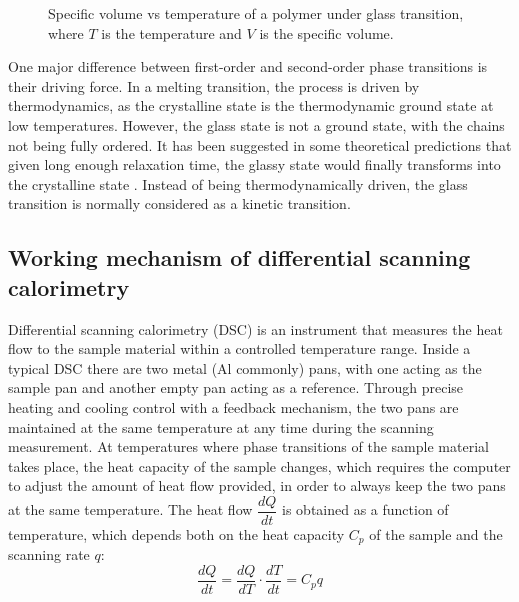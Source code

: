 \begin{figure}[H]
	\center
{}
	\caption{Specific volume vs temperature of a polymer under glass transition, where $T$ is the temperature and $V$ is the specific volume.}
	\label{fig:V vs T for Tg}
\end{figure}

One major difference between first-order and second-order phase transitions is their driving force. In a melting transition, the process is driven by thermodynamics, as the crystalline state is the thermodynamic ground state at low temperatures. However, the glass state is not a ground state, with the chains not being fully ordered. It has been suggested in some theoretical predictions that given long enough relaxation time, the glassy state would finally transforms into the crystalline state \cite{Gotze2009}. Instead of being thermodynamically driven, the glass transition is normally considered as a kinetic transition.

\subsection{Working mechanism of differential scanning calorimetry}

Differential scanning calorimetry (DSC) is an instrument that measures the heat flow to the sample material within a controlled temperature range. Inside a typical DSC there are two metal (Al commonly) pans, with one acting as the sample pan and another empty pan acting as a reference. Through precise heating and cooling control with a feedback mechanism, the two pans are maintained at the same temperature at any time during the scanning measurement. At temperatures where phase transitions of the sample material takes place, the heat capacity of the sample changes, which requires the computer to adjust the amount of heat flow provided, in order to always keep the two pans at the same temperature. The heat flow $\dfrac{dQ}{dt}$ is obtained as a function of temperature, which depends both on the heat capacity $C_{p}$ of the sample and the scanning rate $q$:
\begin{equation}
\label{eqn_DSC}
\dfrac{dQ}{dt} = \dfrac{dQ}{dT}\cdot\dfrac{dT}{dt} = C_{p} q
\end{equation}

